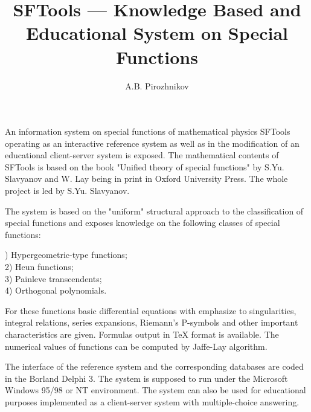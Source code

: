 \pagestyle{empty}


\title{SFTools --- Knowledge Based and Educational System on Special Functions}
\author{A.B. Pirozhnikov}
\date{}
\maketitle

An information system on special functions of mathematical physics
SFTools operating as an interactive reference system as well as
in the modification of an educational client-server system is exposed.
The mathematical contents of SFTools is based on the book "Unified
theory of special functions" by S.Yu. Slavyanov and W. Lay being in
print in Oxford University Press. The whole project is led by
S.Yu. Slavyanov.

The system is based on the "uniform" structural approach to the
classification of special functions and exposes knowledge on the
following classes of special functions:

) Hypergeometric-type functions; \\
2) Heun functions; \\
3) Painleve transcendents; \\
4) Orthogonal polynomials.

For these functions basic differential equations with emphasize to
singularities, integral relations, series expansions, Riemann's
P-symbols and other important characteristics are given. Formulas
output in TeX format is available. The numerical values of functions
can be computed by Jaffe-Lay algorithm.


The interface of the reference system and the corresponding databases
are coded in the Borland Delphi 3. The system is supposed to run under
the Microsoft Windows 95/98 or NT environment. The system can also be
used for educational purposes implemented as a client-server system
with multiple-choice answering.


